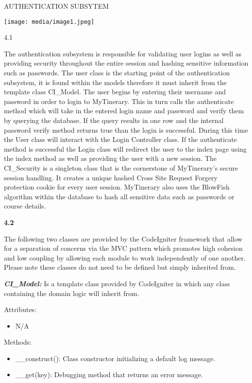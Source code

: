 AUTHENTICATION SUBSYTEM

\texttt{[image: media/image1.jpeg]}

4.1

The authentication subsystem is responsible for validating user logins
as well as providing security throughout the entire session and hashing
sensitive information such as passwords. The user class is the starting
point of the authentication subsystem, it is found within the models
therefore it must inherit from the template class CI\_Model. The user
begins by entering their username and password in order to login to
MyTinerary. This in turn calls the authenticate method which will take
in the entered login name and password and verify them by querying the
database. If the query results in one row and the internal password
verify method returns true than the login is successful. During this
time the User class will interact with the Login Controller class. If
the authenticate method is successful the Login class will redirect the
user to the index page using the index method as well as providing the
user with a new session. The CI\_Security is a singleton class that is
the cornerstone of MyTinerary's secure session handling. It creates a
unique hashed Cross Site Request Forgery protection cookie for every
user session. MyTinerary also uses the BlowFish algorithm within the
database to hash all sensitive data such as passwords or course details.

\textbf{4.2}

The following two classes are provided by the CodeIgniter framework that
allow for a separation of concerns via the MVC pattern which promotes
high cohesion and low coupling by allowing each module to work
independently of one another. Please note these classes do not need to
be defined but simply inherited from.

\textbf{\emph{CI\_Model:}} Is a template class provided by CodeIgniter
in which any class containing the domain logic will inherit from.

Attributes:

\begin{itemize}
\item
  N/A
\end{itemize}

Methods:

\begin{itemize}
\item
  \_\_construct(): Class constructor initializing a default log message.
\item
  \_\_get(key): Debugging method that returns an error message.
\end{itemize}

